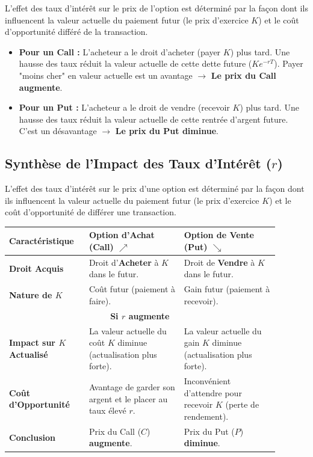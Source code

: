 \begin{intuitionbox}
L'effet des taux d'intérêt sur le prix de l'option est déterminé par la façon dont ils influencent la valeur actuelle du paiement futur (le prix d'exercice $K$) et le coût d'opportunité différé de la transaction.

\begin{itemize}
    \item \textbf{Pour un Call :} L'acheteur a le droit d'acheter (payer $K$) plus tard. Une hausse des taux réduit la valeur actuelle de cette dette future ($Ke^{-rT}$). Payer "moins cher" en valeur actuelle est un avantage $\to$ \textbf{Le prix du Call augmente}.
    \item \textbf{Pour un Put :} L'acheteur a le droit de vendre (recevoir $K$) plus tard. Une hausse des taux réduit la valeur actuelle de cette rentrée d'argent future. C'est un désavantage $\to$ \textbf{Le prix du Put diminue}.
\end{itemize}
\end{intuitionbox}

\subsection{Synthèse de l'Impact des Taux d'Intérêt ($r$)}

L'effet des taux d'intérêt sur le prix d'une option est déterminé par la façon dont ils influencent la valeur actuelle du paiement futur (le prix d'exercice $K$) et le coût d'opportunité de différer une transaction.

\renewcommand{\arraystretch}{1.5}
\begin{tabular}{|p{0.25\linewidth}|p{0.32\linewidth}|p{0.32\linewidth}|}
\hline
\textbf{Caractéristique} & \textbf{Option d'Achat (Call)} $\nearrow$ & \textbf{Option de Vente (Put)} $\searrow$ \\
\hline
\textbf{Droit Acquis} & Droit d'\textbf{Acheter} à $K$ dans le futur. & Droit de \textbf{Vendre} à $K$ dans le futur. \\
\hline
\textbf{Nature de $K$} & Coût futur (paiement à faire). & Gain futur (paiement à recevoir). \\
\hline
\multicolumn{3}{|c|}{\textbf{Si $r$ augmente}} \\
\hline
\textbf{Impact sur $K$ Actualisé} & La valeur actuelle du coût $K$ diminue (actualisation plus forte). & La valeur actuelle du gain $K$ diminue (actualisation plus forte). \\
\hline
\textbf{Coût d'Opportunité} & Avantage de garder son argent et le placer au taux élevé $r$. & Inconvénient d'attendre pour recevoir $K$ (perte de rendement). \\
\hline
\textbf{Conclusion} & Prix du Call ($C$) \textbf{augmente}. & Prix du Put ($P$) \textbf{diminue}. \\
\hline
\end{tabular}

